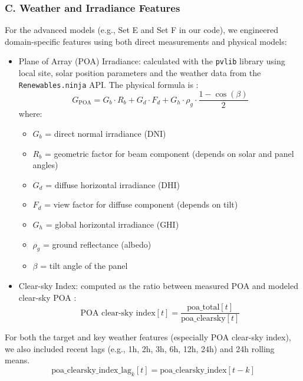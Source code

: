 \subsubsection*{C. Weather and Irradiance Features}
For the advanced models (e.g., Set E and Set F in our code), we engineered domain-specific 
features using both direct measurements and physical models:
\begin{itemize}
    \item Plane of Array (POA) Irradiance: calculated with the \texttt{pvlib} library using 
    local site, solar position parameters and the weather data from the 
    \texttt{Renewables.ninja} API. The physical formula is :
    \begin{equation}
    G_{\text{POA}} = G_b \cdot R_b + G_d \cdot F_d + G_h \cdot \rho_g \cdot \frac{1 - \cos(\beta)}{2}  
    \end{equation}
    where:
    \begin{itemize}
        \item $G_b$ = direct normal irradiance (DNI)
        \item $R_b$ = geometric factor for beam component (depends on solar and panel angles)
        \item $G_d$ = diffuse horizontal irradiance (DHI)
        \item $F_d$ = view factor for diffuse component (depends on tilt)
        \item $G_h$ = global horizontal irradiance (GHI)
        \item $\rho_g$ = ground reflectance (albedo)
        \item $\beta$ = tilt angle of the panel
    \end{itemize}
 \item Clear-sky Index: computed as the ratio between measured POA and modeled 
    clear-sky POA :
    \begin{equation}
    \text{POA clear-sky index}[t] = \frac{\text{poa\_total}[t]}{\text{poa\_clearsky}[t]}
    \end{equation}
\end{itemize}  
For both the target and key weather features (especially POA clear-sky index), we also 
included recent lags (e.g., 1h, 2h, 3h, 6h, 12h, 24h) and 24h rolling means.
\[
\text{poa\_clearsky\_index\_lag}_k[t] = \text{poa\_clearsky\_index}[t-k]
\]

